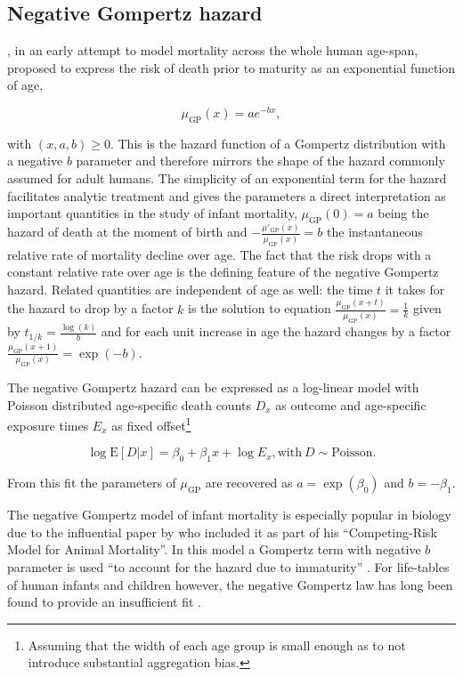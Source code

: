 \documentclass[smallextended]{svjour3} %
\begin{document}
\subsection*{Negative Gompertz hazard}\label{negative-gompertz-hazard}

\citet{Thiele1871}, in an early attempt to model mortality across the
whole human age-span, proposed to express the risk of death prior to
maturity as an exponential function of age,

\[
\mu_\text{GP}(x) = ae^{-bx},
\]

with \((x,a,b)\geq 0\). This is the hazard function of a Gompertz
distribution with a negative \(b\) parameter and therefore mirrors the
shape of the hazard commonly assumed for adult humans. The simplicity of
an exponential term for the hazard facilitates analytic treatment and
gives the parameters a direct interpretation as important quantities in
the study of infant mortality, \(\mu_\text{GP}(0)=a\) being the hazard
of death at the moment of birth and
\(-\frac{\mu'_\text{GP}(x)}{\mu_\text{GP}(x)}=b\) the instantaneous
relative rate of mortality decline over age. The fact that the risk
drops with a constant relative rate over age is the defining feature of
the negative Gompertz hazard. Related quantities are independent of age
as well: the time \(t\) it takes for the hazard to drop by a factor
\(k\) is the solution to equation
\(\frac{\mu_\text{GP}(x+t)}{\mu_\text{GP}(x)} = \frac{1}{k}\) given by
\(t_{1/k}=\frac{\log(k)}{b}\) and for each unit increase in age the
hazard changes by a factor
\(\frac{\mu_\text{GP}(x+1)}{\mu_\text{GP}(x)}=\exp(-b)\).

The negative Gompertz hazard can be expressed as a log-linear model with
Poisson distributed age-specific death counts \(D_x\) as outcome and
age-specific exposure times \(E_x\) as fixed offset\footnote{Assuming
  that the width of each age group is small enough as to not introduce
  substantial aggregation bias.}

\[
\log\text{E}[D|x] = \beta_0 + \beta_1x + \log E_x, \text{with}~D\sim\text{Poisson}.
\]

From this fit the parameters of \(\mu_\text{GP}\) are recovered as
\(a = \exp(\beta_0)\) and \(b = -\beta_1\).

The negative Gompertz model of infant mortality is especially popular in
biology due to the influential paper by \citet{Siler1979} who included
it as part of his ``Competing-Risk Model for Animal Mortality''. In this
model a Gompertz term with negative \(b\) parameter is used ``to account
for the hazard due to immaturity'' \citep{Siler1979}. For life-tables of
human infants and children however, the negative Gompertz law has long
been found to provide an insufficient fit
\citetext{\citealp[p.~326]{Thiele1871}; \citealp{Choe1981}; \citealp{Gage1986}}.
\end{document}
